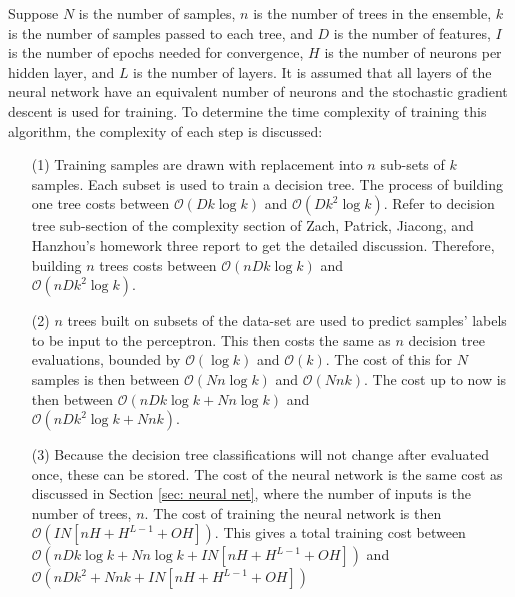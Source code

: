 \documentclass[paper=a4, fontsize=11pt]{scrartcl} %
\begin{document}
Suppose $N$ is the number of samples, $n$ is the number of trees in the ensemble, $k$ is the number of samples passed to each tree, and $D$ is the number of features, $I$ is the number of epochs needed for convergence, $H$ is the number of neurons per hidden layer, and $L$ is the number of layers.
It is assumed that all layers of the neural network have an equivalent number of neurons and the stochastic gradient descent is used for training.
To determine the time complexity of training this algorithm, the complexity of each step is discussed:
\begin{itemize}
	\item[(1)] 
	Training samples are drawn with replacement into $n$ sub-sets of $k$ samples.
	Each subset is used to train a decision tree.
	The process of building one tree costs between $\mathcal{O}\left( D k \log k \right)$ and  $\mathcal{O} \left(D k^2 \log k \right)$. 
	Refer to decision tree sub-section of the complexity section of Zach, Patrick, Jiacong, and Hanzhou's homework three report to get the detailed discussion.
	Therefore, building $n$ trees costs between $\mathcal{O} \left( n D k \log k \right)$ and \\ $\mathcal{O} \left( n D k^2 \log k \right)$.
	
	\item[(2)] 
	$n$ trees built on subsets of the data-set are used to predict samples' labels to be input to the perceptron.
	This then costs the same as $n$ decision tree evaluations, bounded by $\mathcal{O} \left( \log k \right)$ and $\mathcal{O} \left( k \right)$.
	The cost of this for $N$ samples is then between $\mathcal{O} \left( N n \log k \right)$ and $\mathcal{O} \left( N n k \right)$.
	The cost up to now is then between $\mathcal{O} \left( n D k \log k + N n \log k \right)$ and \\ $\mathcal{O} \left( n D k^2 \log k + N n k \right)$.
	
	\item[(3)] 
	Because the decision tree classifications will not change after evaluated once, these can be stored.
	The cost of the neural network is the same cost as discussed in Section \ref{sec: neural net}, where the number of inputs is the number of trees, $n$. 
	The cost of training the neural network is then $\mathcal{O}\left(I  N \left[n  H + H^{L-1} + O H \right]\right)$.
	This gives a total training cost between \\ $\mathcal{O} \left( n D k \log k + N n \log k + I N \left[ n H + H^{L-1} + O H \right] \right)$ and \\ $\mathcal{O} \left( n D k^2 + N n k + I N \left[ n H + H^{L-1} + O H \right]\right)$
\end{itemize}
\end{document}
